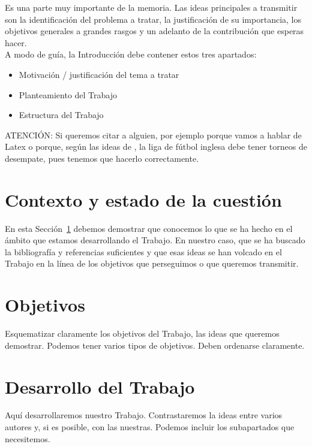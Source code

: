 \documentclass[11pt,a4paper,spanish]{book}
\begin{document}
Es una parte muy importante de la memoria. Las ideas principales a transmitir son la identificación del problema a tratar, la justificación de su importancia, los objetivos generales a grandes rasgos y un adelanto de la contribución que esperas hacer.\\

A modo de guía, la Introducción debe contener estos tres apartados:
\begin{itemize}
\item Motivación / justificación del tema a tratar
\item Planteamiento del Trabajo
\item Estructura del Trabajo
\end{itemize}


ATENCIÓN:  Si queremos citar a alguien, por ejemplo porque vamos a hablar de Latex \citep{lamport1994} o porque, según las ideas de \cite{ackerman2017}, la liga de fútbol inglesa debe tener torneos de desempate, pues tenemos que hacerlo correctamente.



\chapter{Contexto y estado de la cuestión}\label{contexto}

En esta Sección~\ref{contexto} debemos demostrar que conocemos lo que se ha hecho en el ámbito que estamos desarrollando el Trabajo. En nuestro caso, que se ha buscado la bibliografía y referencias suficientes y que esas ideas se han volcado en el Trabajo en la línea de los objetivos que perseguimos o que queremos transmitir.


\chapter{Objetivos}

Esquematizar claramente los objetivos del Trabajo, las ideas que queremos demostrar. Podemos tener varios tipos de objetivos. Deben ordenarse claramente.

\chapter{Desarrollo del Trabajo}

Aquí desarrollaremos nuestro Trabajo. Contrastaremos la ideas entre varios autores y, si es posible, con las nuestras. Podemos incluir los subapartados que necesitemos.
\end{document}

